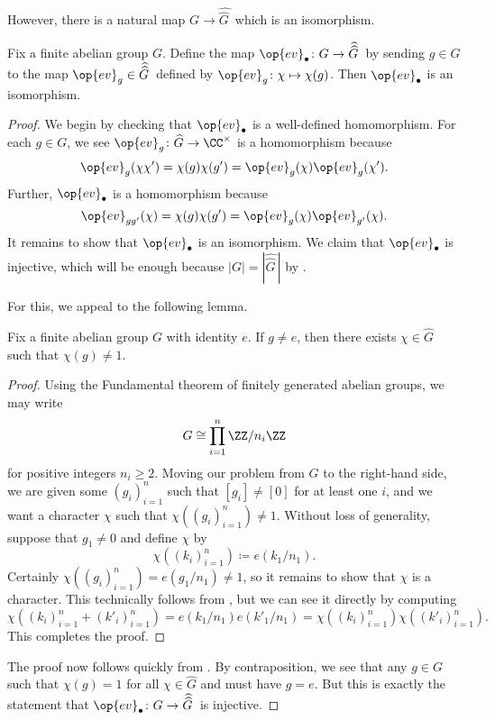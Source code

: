 \documentclass[../notes.tex]{subfiles}
\begin{document}
However, there is a natural map $G\to \widehat{\widehat{G}\,}$ which is an isomorphism.
\begin{proposition}
	Fix a finite abelian group $G$. Define the map $\op{ev}_\bullet\colon G\to \widehat{\widehat{G}\,}$ by sending $g\in G$ to the map $\op{ev}_g\in \widehat{\widehat{G}\,}$ defined by $\op{ev}_g\colon\chi\mapsto\chi(g)$. Then $\op{ev}_\bullet$ is an isomorphism.
\end{proposition}
\begin{proof}
	We begin by checking that $\op{ev}_\bullet$ is a well-defined homomorphism. For each $g\in G$, we see $\op{ev}_g\colon \widehat{G}\to\CC^\times$ is a homomorphism because
	\[\op{ev}_g(\chi\chi')=\chi(g)\chi(g')=\op{ev}_g(\chi)\op{ev}_g(\chi').\]
	Further, $\op{ev}_\bullet$ is a homomorphism because
	\[\op{ev}_{gg'}(\chi)=\chi(g)\chi(g')=\op{ev}_g(\chi)\op{ev}_{g'}(\chi).\]
	It remains to show that $\op{ev}_\bullet$ is an isomorphism. We claim that $\op{ev}_\bullet$ is injective, which will be enough because $|G|=|\widehat{\widehat{G}\,}|$ by .

	For this, we appeal to the following lemma.
	\begin{lemma} \label{lem:annoying-double-dual-lemma}
		Fix a finite abelian group $G$ with identity $e$. If $g\ne e$, then there exists $\chi\in \widehat{G}$ such that $\chi(g)\ne1$.
	\end{lemma}
	\begin{proof}
		Using the Fundamental theorem of finitely generated abelian groups, we may write
		\[G\cong\prod_{i=1}^n\ZZ/n_i\ZZ\]
		for positive integers $n_i\ge2$. Moving our problem from $G$ to the right-hand side, we are given some $(g_i)_{i=1}^n$ such that $[g_i]\ne[0]$ for at least one $i$, and we want a character $\chi$ such that $\chi\left((g_i)_{i=1}^n\right)\ne1$. Without loss of generality, suppose that $g_1\ne0$ and define $\chi$ by
		\[\chi\left((k_i)_{i=1}^n\right)\coloneqq e(k_1/n_1).\]
		Certainly $\chi\left((g_i)_{i=1}^n\right)=e(g_1/n_1)\ne1$, so it remains to show that $\chi$ is a character. This technically follows from , but we can see it directly by computing
		\[\chi\left((k_i)_{i=1}^n+(k'_i)_{i=1}^n\right)=e(k_1/n_1)e(k'_1/n_1)=\chi\left((k_i)_{i=1}^n\right)\chi\left((k'_i)_{i=1}^n\right).\]
		This completes the proof.
	\end{proof}
	The proof now follows quickly from . By contraposition, we see that any $g\in G$ such that $\chi(g)=1$ for all $\chi\in \widehat{G}$ and must have $g=e$. But this is exactly the statement that $\op{ev}_\bullet\colon G\to \widehat{\widehat{G}\,}$ is injective.
\end{proof}
\end{document}
